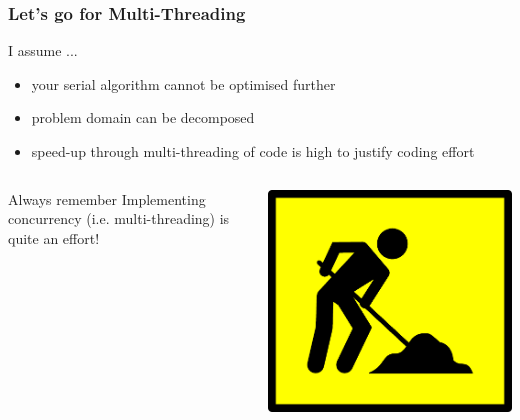 \documentclass[9pt,pdftex]{beamer}
\begin{document}
\begin{frame}
  \frametitle{Let's go for Multi-Threading}
  \begin{block}{I assume ...}
    \begin{itemize}
    \item your serial algorithm cannot be optimised further
    \item problem domain can be decomposed
    \item speed-up through multi-threading of code is high to justify
      coding effort
    \end{itemize}
  \end{block}
  \pause
  \begin{columns}
    \begin{column}{.45\textwidth}
      \begin{alertblock}{Always remember}
        Implementing concurrency (i.e. multi-threading) is quite an effort!\\
      \end{alertblock}
    \end{column}
    \begin{column}{.45\textwidth}
      \begin{center}
        \includegraphics[width=.9\textwidth]{img/nebu_work}
      \end{center}
    \end{column}
  \end{columns}

\end{frame}
\end{document}
